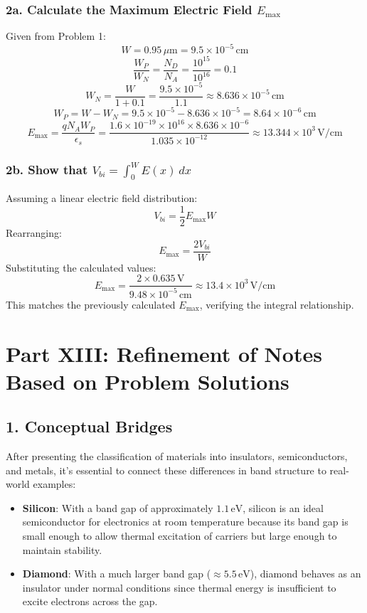 \documentclass[12pt]{article}
\begin{document}
\subsubsection{2a. Calculate the Maximum Electric Field \( E_{\max} \)}
Given from Problem 1:
\[
W = 0.95\, \mu\text{m} = 9.5 \times 10^{-5}\, \text{cm}
\]
\[
\frac{W_P}{W_N} = \frac{N_D}{N_A} = \frac{10^{15}}{10^{16}} = 0.1
\]
\[
W_N = \frac{W}{1 + 0.1} = \frac{9.5 \times 10^{-5}}{1.1} \approx 8.636 \times 10^{-5}\, \text{cm}
\]
\[
W_P = W - W_N = 9.5 \times 10^{-5} - 8.636 \times 10^{-5} = 8.64 \times 10^{-6}\, \text{cm}
\]
\[
E_{\max} = \frac{q N_A W_P}{\epsilon_s} = \frac{1.6 \times 10^{-19} \times 10^{16} \times 8.636 \times 10^{-6}}{1.035 \times 10^{-12}} \approx 13.344 \times 10^{3}\, \text{V/cm}
\]

\subsubsection{2b. Show that \( V_{bi} = \int_0^W E(x) \, dx \)}
Assuming a linear electric field distribution:
\[
V_{bi} = \frac{1}{2} E_{\max} W
\]
Rearranging:
\[
E_{\max} = \frac{2 V_{bi}}{W}
\]
Substituting the calculated values:
\[
E_{\max} = \frac{2 \times 0.635\, \text{V}}{9.48 \times 10^{-5}\, \text{cm}} \approx 13.4 \times 10^{3}\, \text{V/cm}
\]
This matches the previously calculated \( E_{\max} \), verifying the integral relationship.

\section{Part XIII: Refinement of Notes Based on Problem Solutions}

\subsection{1. Conceptual Bridges}
After presenting the classification of materials into insulators, semiconductors, and metals, it's essential to connect these differences in band structure to real-world examples:
\begin{itemize}
    \item \textbf{Silicon}: With a band gap of approximately \(1.1\, \text{eV}\), silicon is an ideal semiconductor for electronics at room temperature because its band gap is small enough to allow thermal excitation of carriers but large enough to maintain stability.
    \item \textbf{Diamond}: With a much larger band gap (\( \approx 5.5\, \text{eV} \)), diamond behaves as an insulator under normal conditions since thermal energy is insufficient to excite electrons across the gap.
\end{itemize}
\end{document}
